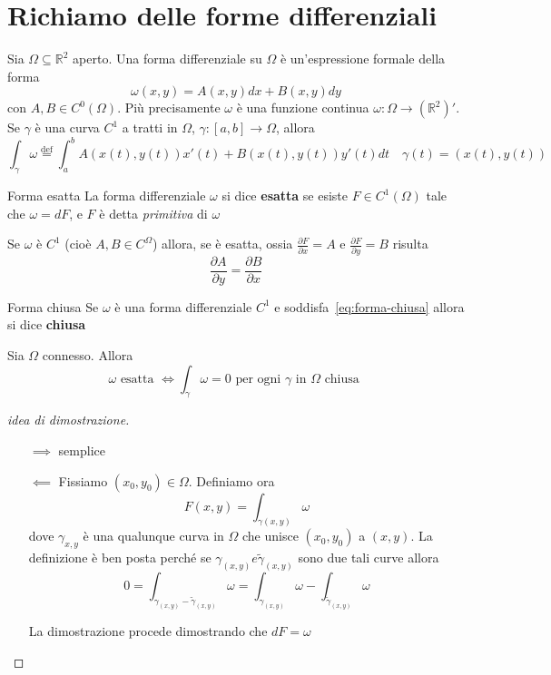 \newpage
\section{Richiamo delle forme differenziali}

Sia \(\Omega \subseteq \mathbb{R}^{2} \) aperto. Una forma differenziale su \(\Omega\) è
un'espressione formale della forma 
\[
    \omega(x, y) = A(x,y)dx + B(x,y) dy
\]
con \(A, B \in C^{0}(\Omega)\). Più precisamente \(\omega\) è una funzione
continua \(\omega: \Omega \to (\mathbb{R}^{2})'\). Se \(\gamma\) è una curva
\(C^{1}\) a tratti in \(\Omega\), \(\gamma : [a,b] \to \Omega\), allora
\[
    \int_{\gamma}\omega \overset{\text{def}}{=} \int_{a}^{b} A{(x(t), y(t))}
    x'{(t)} + B{(x(t), y(t))} y'{(t)} dt \quad \gamma{(t)} = (x(t), y(t))
\]
\begin{definition}{Forma esatta}
    La forma differenziale \(\omega\) si dice \textbf{esatta} se esiste \(F \in
    C^{1}(\Omega)\) tale che \(\omega = dF\), e \(F\) è detta \emph{primitiva}
    di \(\omega\) 
\end{definition}

Se \(\omega\) è \(C^{1}\) (cioè \(A, B \in C^{\Omega}\)) allora, se è esatta,
ossia \(\frac{\partial F}{\partial x} = A\) e \(\frac{\partial F}{\partial y} =
B\) risulta
\begin{equation}\label{eq:forma-chiusa}
    \frac{\partial A}{\partial y} = \frac{\partial B}{\partial x}
\end{equation}

\begin{definition}{Forma chiusa}
    Se \(\omega\) è una forma differenziale \(C^{1}\) e
    soddisfa~\eqref{eq:forma-chiusa} allora si dice \textbf{chiusa} 
\end{definition}
\begin{theorem}\label{thm:1_forme}
    Sia \(\Omega\) connesso. Allora 
    \[
        \omega \text{ esatta } \iff \int_{\gamma} \omega = 0 \text{ per ogni
        \(\gamma\) in \(\Omega\) chiusa }
    \]
\end{theorem}
\begin{proof}[idea di dimostrazione]\( \)
\begin{itemize}
    \item[\(\implies \)] semplice
    \item[\(\impliedby \)] Fissiamo \((x_{0},y_{0}) \in \Omega\). Definiamo ora 
        \[
            F(x, y) = \int_{\gamma(x,y)} \omega
        \]
        dove \(\gamma_{x,y} \) è una qualunque curva in \(\Omega\) che unisce
        \((x_{0},y_{0})\) a \((x,y)\). La definizione è ben posta perché se
        \(\gamma_{(x,y)} e \tilde{\gamma}_{(x,y)}\) sono due tali curve allora
        \[
            0 = \int_{\gamma_{(x,y)} - \tilde{\gamma}_{(x,y)}} \omega =
            \int_{\gamma_{(x,y)}} \omega - \int_{\tilde{\gamma}_{(x,y)}} \omega
        \]

        La dimostrazione procede dimostrando che \(dF = \omega\)
\end{itemize}
\end{proof}

